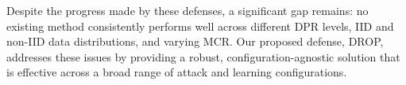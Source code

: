 Despite the progress made by these defenses, a significant gap remains: no existing method consistently performs well across different DPR levels, IID and non-IID data distributions, and varying MCR. Our proposed defense, DROP, addresses these issues by providing a robust, configuration-agnostic solution that is effective across a broad range of attack and learning configurations. 

